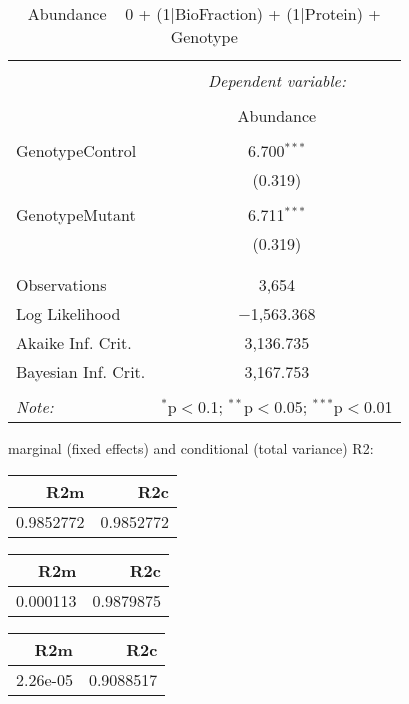 \documentclass[11pt]{report}
\begin{document}
\begin{table}[!htbp] \centering 
  \caption{Abundance ~ 0 + (1|BioFraction) + (1|Protein) + Genotype} 
  \label{} 
\begin{tabular}{@{\extracolsep{5pt}}lc} 
\\[-1.8ex]\hline 
\hline \\[-1.8ex] 
 & \multicolumn{1}{c}{\textit{Dependent variable:}} \\ 
\cline{2-2} 
\\[-1.8ex] & Abundance \\ 
\hline \\[-1.8ex] 
 GenotypeControl & 6.700$^{***}$ \\ 
  & (0.319) \\ 
  & \\ 
 GenotypeMutant & 6.711$^{***}$ \\ 
  & (0.319) \\ 
  & \\ 
\hline \\[-1.8ex] 
Observations & 3,654 \\ 
Log Likelihood & $-$1,563.368 \\ 
Akaike Inf. Crit. & 3,136.735 \\ 
Bayesian Inf. Crit. & 3,167.753 \\ 
\hline 
\hline \\[-1.8ex] 
\textit{Note:}  & \multicolumn{1}{r}{$^{*}$p$<$0.1; $^{**}$p$<$0.05; $^{***}$p$<$0.01} \\ 
\end{tabular} 
\end{table} 
marginal (fixed effects) and conditional (total variance) R2:

\begin{tabular}{r|r}
\hline
R2m & R2c\\
\hline
0.9852772 & 0.9852772\\
\hline
\end{tabular}

\begin{tabular}{r|r}
\hline
R2m & R2c\\
\hline
0.000113 & 0.9879875\\
\hline
\end{tabular}

\begin{tabular}{r|r}
\hline
R2m & R2c\\
\hline
2.26e-05 & 0.9088517\\
\hline
\end{tabular}
\end{document}
